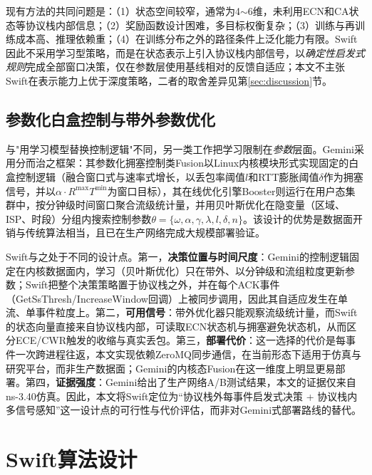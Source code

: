 \documentclass[10pt,twocolumn]{article}
\begin{document}
现有方法的共同问题是：（1）状态空间较窄，通常为4$\sim$6维，未利用ECN和CA状态等协议栈内部信息；（2）奖励函数设计困难，多目标权衡复杂；（3）训练与再训练成本高、推理依赖重；（4）在训练分布之外的路径条件上泛化能力有限。Swift因此不采用学习型策略，而是在状态表示上引入协议栈内部信号，以\emph{确定性启发式规则}完成全部窗口决策，仅在参数层使用基线相对的反馈自适应；本文不主张Swift在表示能力上优于深度策略，二者的取舍差异见第\ref{sec:discussion}节。

\subsection{参数化白盒控制与带外参数优化}
\label{subsec:gemini}

与"用学习模型替换控制逻辑"不同，另一类工作把学习限制在\emph{参数}层面。Gemini\cite{gemini}采用分而治之框架：其参数化拥塞控制类Fusion以Linux内核模块形式实现固定的白盒控制逻辑（融合窗口式与速率式增长，以丢包率阈值$l$和RTT膨胀阈值$\delta$作为拥塞信号，并以$\alpha \cdot R^{\max}T^{\min}$为窗口目标），其在线优化引擎Booster则运行在用户态集群中，按分钟级时间窗口聚合流级统计量，并用贝叶斯优化在隐变量（区域、ISP、时段）分组内搜索控制参数$\theta=\{\omega,\alpha,\gamma,\lambda,l,\delta,n\}$。该设计的优势是数据面开销与传统算法相当，且已在生产网络完成大规模部署验证。

Swift与之处于不同的设计点。第一，\textbf{决策位置与时间尺度}：Gemini的控制逻辑固定在内核数据面内，学习（贝叶斯优化）只在带外、以分钟级和流组粒度更新参数；Swift把整个决策策略置于协议栈之外，并在每个ACK事件（GetSsThresh/IncreaseWindow回调）上被同步调用，因此其自适应发生在单流、单事件粒度上。第二，\textbf{可用信号}：带外优化器只能观察流级统计量，而Swift的状态向量直接来自协议栈内部，可读取ECN状态机与拥塞避免状态机，从而区分ECE/CWR触发的收缩与真实丢包。第三，\textbf{部署代价}：这一选择的代价是每事件一次跨进程往返，本文实现依赖ZeroMQ同步通信，在当前形态下适用于仿真与研究平台，而非生产数据面；Gemini的内核态Fusion在这一维度上明显更易部署。第四，\textbf{证据强度}：Gemini给出了生产网络A/B测试结果，本文的证据仅来自ns-3.40仿真。因此，本文将Swift定位为“协议栈外每事件启发式决策 + 协议栈内多信号感知”这一设计点的可行性与代价评估，而非对Gemini式部署路线的替代。


\section{Swift算法设计}
\end{document}
